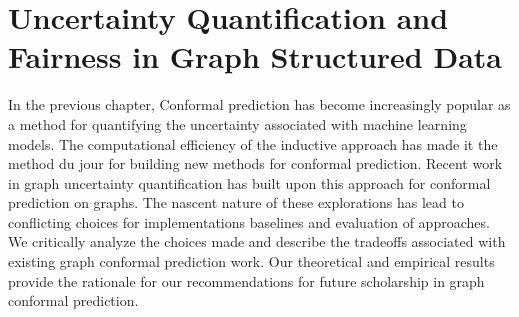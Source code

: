 \chapter{Uncertainty Quantification and Fairness in Graph Structured Data}
In the previous chapter, 
Conformal prediction has become increasingly popular as a method for quantifying the 
uncertainty associated with machine learning models. 
The computational efficiency of the inductive approach has made it the method du jour for building new methods for conformal prediction.
Recent work in graph uncertainty quantification has built upon this approach for conformal prediction on graphs.
The nascent nature of these explorations has lead to conflicting choices for implementations baselines and evaluation of approaches.
We critically analyze the choices made and describe the tradeoffs associated with existing graph conformal prediction work. 
Our theoretical and empirical results provide the rationale for our recommendations for future scholarship in graph conformal prediction.